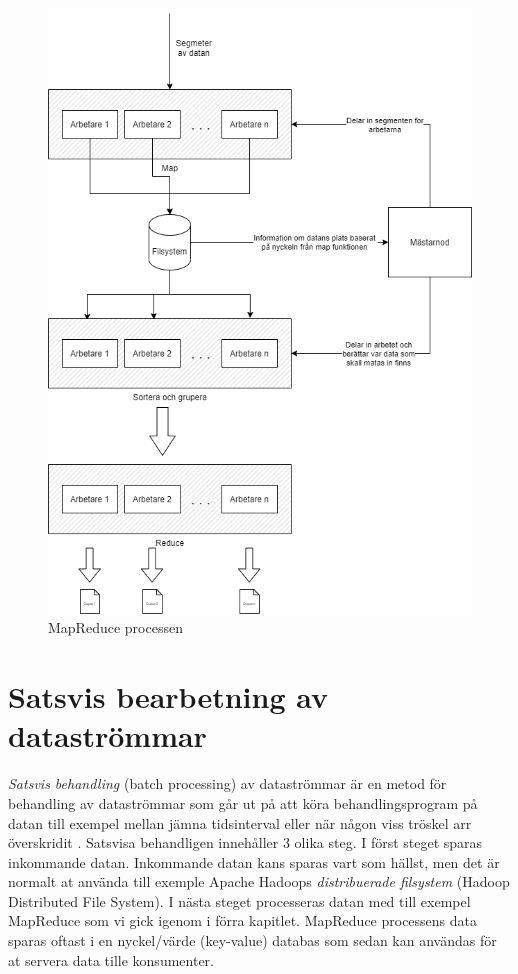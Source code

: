 \begin{figure}[h]
    \centering
    \includegraphics[scale=0.5]{src/thesis/img/map-reduce.png}
    \caption{MapReduce processen}
    \label{fig:mesh1}
\end{figure}

\section{Satsvis bearbetning av dataströmmar}

\textit{Satsvis behandling} (batch processing) av dataströmmar är en metod för behandling av 
dataströmmar som går ut på att köra behandlingsprogram på datan till exempel mellan jämna
tidsinterval eller när någon viss tröskel arr överskridit \citep{marz2013big}. Satsvisa behandligen
innehåller 3 olika steg. I först steget sparas inkommande datan. Inkommande datan kans sparas vart
som hällst, men det är normalt at använda till exemple Apache Hadoops \textit{distribuerade 
filsystem} (Hadoop Distributed File System). I nästa steget processeras datan med till exempel
MapReduce som vi gick igenom i förra kapitlet. MapReduce processens data sparas oftast i en 
nyckel/värde (key-value) databas som sedan kan användas för at servera data tille konsumenter.

